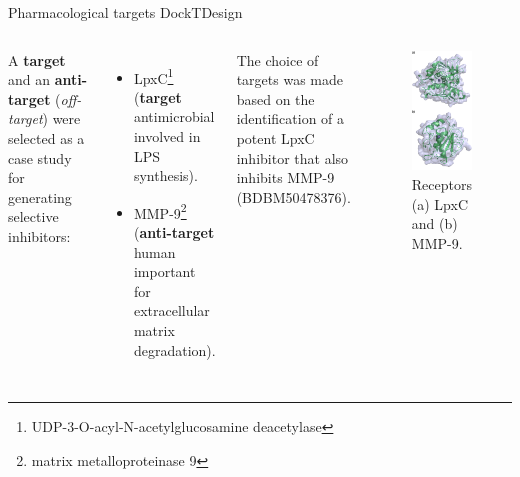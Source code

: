 \documentclass[aspectratio=169,xcolor=dvipsnames]{beamer}
\begin{document}
\begin{frame}{Pharmacological targets \hfill {\footnotesize \alert{DockTDesign}}}
    \begin{columns}[c]
        A \textbf{target} and an \textbf{anti-target} (\textit{off-target}) were selected as a case study for generating selective inhibitors:
        \begin{itemize}
            \item LpxC\footnote{UDP-3-O-acyl-N-acetylglucosamine deacetylase} (\textbf{target} antimicrobial involved in LPS synthesis).
            \item MMP-9\footnote{matrix metalloproteinase 9} (\textbf{anti-target} human important for extracellular matrix degradation).
        \end{itemize}
        \vspace{1em}
        The choice of targets was made based on the identification of a potent LpxC inhibitor that also inhibits MMP-9 (BDBM50478376).
        \vspace{1em}

        \begin{figure}
            \centering
            \includegraphics[width=.45\linewidth]{imgs/lpxc_mmp9_receptors.png}
            \caption{Receptors (a) LpxC and (b) MMP-9.}
        \end{figure}
    \end{columns}




\end{frame}
\end{document}
